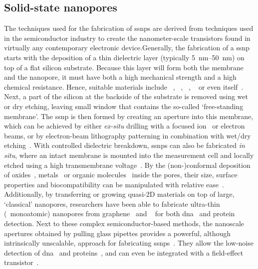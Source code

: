 \subsection{Solid-state nanopores}
%

The techniques used for the fabrication of \glspl{ssnp} are derived from techniques used in the semiconductor
industry to create the nanometer-scale transistors found in virtually any contemporary electronic
device.Generally, the fabrication of a \gls{ssnp} starts with the deposition of a thin dielectric layer
(typically \SIrange{5}{50}{\nm}) on top of a flat silicon substrate. Because this layer will form both the
membrane and the nanopore, it must have both a high mechanical strength and a high chemical resistance. Hence,
suitable materials include ~\cite{Li-2001,Storm-2003}, ~\cite{Storm-2005},
~\cite{Venkatesan-2009}, ~\cite{Larkin-2013} or even 
itself~\cite{Malachowski-2013}. Next, a part of the silicon at the backside of the substrate is removed using
wet or dry etching, leaving small window that contains the so-called `free-standing membrane'. The \gls{ssnp}
is then formed by creating an aperture into this membrane, which can be achieved by either \textit{ex-situ}
drilling with a focused ion~\cite{Li-2001} or electron~\cite{Storm-2003} beams, or by electron-beam
lithography patterning in combination with wet/dry etching~\cite{Nam-2009}. With controlled dielectric
breakdown, \glspl{ssnp} can also be fabricated \textit{in situ}, where an intact membrane is mounted into the
measurement cell and locally etched using a high transmembrane voltage~\cite{Kwok-2014}. By the
(non-)conformal deposition of oxides~\cite{Chen-2004}, metals~\cite{Li-2013d,Auger-2014,Spitzberg-2019} or
organic molecules~\cite{Wanunu-2007,Yusko-2011,Wei-2012,Rotem-2012} inside the pores, their size, surface
properties and biocompatibility can be manipulated with relative ease~\cite{Eggenberger-2019}. Additionally, by
transferring or growing quasi-2D materials on top of large, `classical' nanopores, researchers have been able
to fabricate ultra-thin (\ie~monoatomic) nanopores from graphene~\cite{Fischbein-2008} and
~\cite{Feng-2015b} for both \gls{dna}~\cite{Feng-2015,Merchant-2010,Song-2011} and
protein~\cite{Shan-2013} detection. Next to these complex semiconductor-based methods, the nanoscale apertures
obtained by pulling glass pipettes provides a powerful, although intrinsically unscalable, approach for
fabricating \glspl{ssnp}~\cite{Wang-2006}. They allow the low-noise detection of
\gls{dna}~\cite{Steinbock-2013} and proteins~\cite{Li-2013B}, and can even be integrated with a field-effect
transistor~\cite{Ren-2020}.


